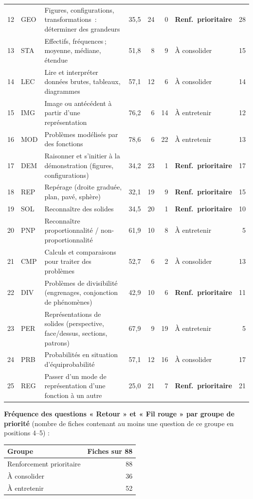 {\begin{tabular}{@{}l l p{7.6cm} r r r l r@{}}
12 & GEO & Figures, configurations, transformations~: déterminer des grandeurs & 35,5 & 24 & 0 & \textbf{Renf.\ prioritaire} & 28 \\
13 & STA & Effectifs, fréquences\,; moyenne, médiane, étendue & 51,8 & 8 & 9 & À consolider & 15 \\
14 & LEC & Lire et interpréter données brutes, tableaux, diagrammes & 57,1 & 12 & 6 & À consolider & 14 \\
15 & IMG & Image ou antécédent à partir d'une représentation & 76,2 & 6 & 14 & À entretenir & 12 \\
16 & MOD & Problèmes modélisés par des fonctions & 78,6 & 6 & 22 & À entretenir & 13 \\
17 & DEM & Raisonner et s'initier à la démonstration (figures, configurations) & 34,2 & 23 & 1 & \textbf{Renf.\ prioritaire} & 17 \\
18 & REP & Repérage (droite graduée, plan, pavé, sphère) & 32,1 & 19 & 9 & \textbf{Renf.\ prioritaire} & 15 \\
19 & SOL & Reconnaître des solides & 34,5 & 20 & 1 & \textbf{Renf.\ prioritaire} & 10 \\
20 & PNP & Reconnaître proportionnalité / non-proportionnalité & 61,9 & 10 & 8 & À entretenir & 5 \\
21 & CMP & Calculs et comparaisons pour traiter des problèmes & 52,7 & 6 & 2 & À consolider & 13 \\
22 & DIV & Problèmes de divisibilité (engrenages, conjonction de phénomènes) & 42,9 & 10 & 6 & \textbf{Renf.\ prioritaire} & 11 \\
23 & PER & Représentations de solides (perspective, face/dessus, sections, patrons) & 67,9 & 9 & 19 & À entretenir & 5 \\
24 & PRB & Probabilités en situation d'équiprobabilité & 57,1 & 12 & 16 & À consolider & 17 \\
25 & REG & Passer d'un mode de représentation d'une fonction à un autre & 25,0 & 21 & 7 & \textbf{Renf.\ prioritaire} & 21 \\
\bottomrule\end{tabular}}\par\bigskip
\textbf{Fréquence des questions « Retour » et « Fil rouge » par groupe de priorité} (nombre de fiches contenant au moins une question de ce groupe en positions 4–5) :\par\smallskip
\begin{tabular}{@{}l r@{}}\toprule Groupe & Fiches sur 88 \\ \midrule
Renforcement prioritaire & 88 \\
À consolider & 36 \\
À entretenir & 52 \\
\bottomrule\end{tabular}\par